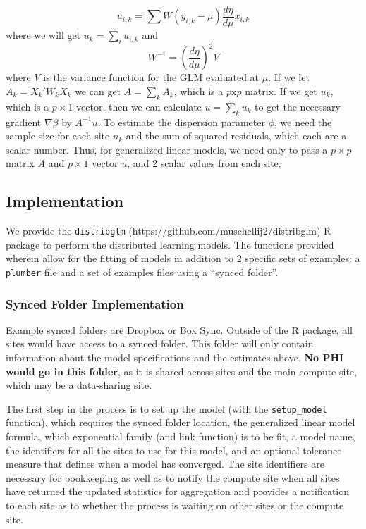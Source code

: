 \documentclass[]{elsarticle} %
\begin{document}
\[
u_{i,k} = \sum W (y_{i,k} - \mu) \frac{d\eta}{d\mu}x_{i,k}
\] where we will get \(u_{k} = \sum_{i} u_{i, k}\) and \[
W^{-1} = \left(\frac{d\eta}{d\mu}\right)^2V
\] where \(V\) is the variance function for the GLM evaluated at
\(\mu\). If we let \(A_{k} = X_k'W_kX_k\) we can get
\(A = \sum_{k}A_{k}\), which is a \(p\text{x}p\) matrix. If we get
\(u_{k}\), which is a \(p\times 1\) vector, then we can calculate
\(u = \sum_{k} u_{k}\) to get the necessary gradient \(\nabla\beta\) by
\(A^{-1} u\). To estimate the dispersion parameter \(\phi\), we need the
sample size for each site \(n_{k}\) and the sum of squared residuals,
which each are a scalar number. Thus, for generalized linear models, we
need only to pass a \(p\times{p}\) matrix \(A\) and \(p\times{1}\)
vector \(u\), and 2 scalar values from each site.

\hypertarget{implementation}{%
\subsection{Implementation}\label{implementation}}

We provide the \texttt{distribglm}
(https://github.com/muschellij2/distribglm) R package to perform the
distributed learning models. The functions provided wherein allow for
the fitting of models in addition to 2 specific sets of examples: a
\texttt{plumber} file and a set of examples files using a ``synced
folder''.

\hypertarget{synced-folder-implementation}{%
\subsubsection{Synced Folder
Implementation}\label{synced-folder-implementation}}

Example synced folders are Dropbox or Box Sync. Outside of the R
package, all sites would have access to a synced folder. This folder
will only contain information about the model specifications and the
estimates above. \textbf{No PHI would go in this folder}, as it is
shared across sites and the main compute site, which may be a
data-sharing site.

The first step in the process is to set up the model (with the
\texttt{setup\_model} function), which requires the synced folder
location, the generalized linear model formula, which exponential family
(and link function) is to be fit, a model name, the identifiers for all
the sites to use for this model, and an optional tolerance measure that
defines when a model has converged. The site identifiers are necessary
for bookkeeping as well as to notify the compute site when all sites
have returned the updated statistics for aggregation and provides a
notification to each site as to whether the process is waiting on other
sites or the compute site.
\end{document}
